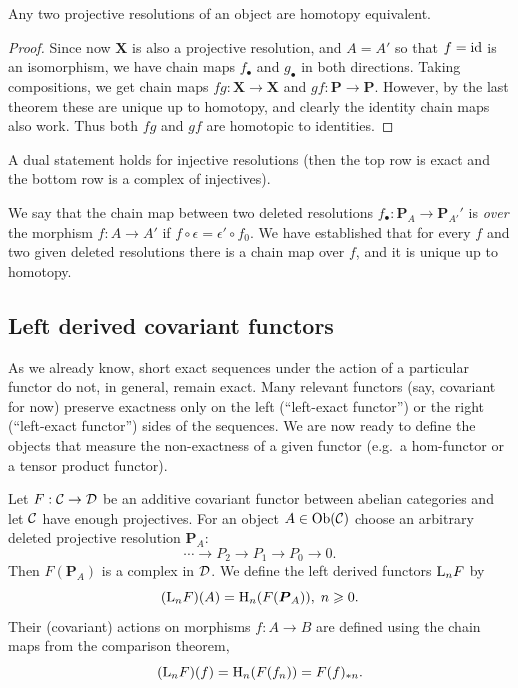 \begin{cor}
    Any two projective resolutions of an object are homotopy equivalent.
\end{cor}
\begin{proof}
     Since now $\bm X$ is also a projective resolution, and $A=A'$ so that $f=\operatorname{id}$ is an isomorphism, we have chain maps $f_\bullet$ and $g_\bullet$ in both directions. Taking compositions, we get chain maps $fg:\bm{X}\to \bm{X}$ and $gf:\bm{P}\to \bm{P}$. However, by the last theorem these are unique up to homotopy, and clearly the identity chain maps also work. Thus both $fg$ and $gf$ are homotopic to identities.
\end{proof}

\begin{cor}\label{thm comparison for injectives}
    A dual statement holds for injective resolutions (then the top row is exact and the bottom row is a complex of injectives).
\end{cor}

\begin{defn}
    We say that the chain map between two deleted resolutions $f_\bullet:\bm{P}_A\to \bm{P}_{A'}'$ is \emph{over} the morphism $f:A\to A'$ if $f\circ \epsilon=\epsilon '\circ f_0$. We have established that for every $f$ and two given deleted resolutions there is a chain map over $f$, and it is unique up to homotopy.
\end{defn}


\subsection{Left derived covariant functors}

As we already know, short exact sequences under the action of a particular functor do not, in general, remain exact. Many relevant functors (say, covariant for now) preserve exactness only on the left (``left-exact functor'') or the right (``left-exact functor'') sides of the sequences. We are now ready to define the objects that measure the non-exactness of a given functor (e.g.\ a hom-functor or a tensor product functor).

\begin{defn}
    Let $F:\mathcal{C}\to \mathcal{D}$ be an additive covariant functor between abelian categories and let $\mathcal{C}$ have enough projectives. For an object $A\in \operatorname{Ob}(\mathcal{C})$ choose an arbitrary deleted projective resolution $\bm{P}_A$:
    \[\cdots \to P_2\to P_1\to P_0 \to 0.\]
    Then $F(\bm{P}_A)$ is a complex in $\mathcal{D}$. We define the left derived functors $\mathrm{L}_nF$ by 
    \[(\mathrm{L}_n F) (A)=\mathrm{H}_n(F(\boldsymbol{P}_A)), \; n\geqslant 0.\]
    Their (covariant) actions on morphisms $f:A\to B$ are defined using the chain maps from the comparison theorem, \[(\mathrm{L}_n F)(f)=\mathrm{H}_n(F(f_n))=F(f)_{\ast n}.\]
\end{defn}

